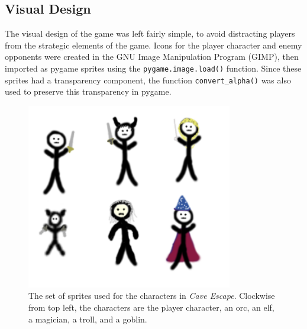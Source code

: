 \subsection{Visual Design}
The visual design of the game was left fairly simple, to avoid distracting players from the strategic elements of the game. Icons for the player character and enemy opponents were created in the GNU Image Manipulation Program (GIMP), then imported as pygame sprites using the \texttt{pygame.image.load()} function. Since these sprites had a transparency component, the function \texttt{convert\_alpha()} was also used to preserve this transparency in pygame.\\

\begin{figure}[H]
  \centering
  \includegraphics[width=9cm]{sprites/SpriteSheet.png}
  \caption{The set of sprites used for the characters in \textit{Cave Escape}. Clockwise from top left, the characters are the player character, an orc, an elf, a magician, a troll, and a goblin.}
  \label{fig:SpriteSheet}
\end{figure}

